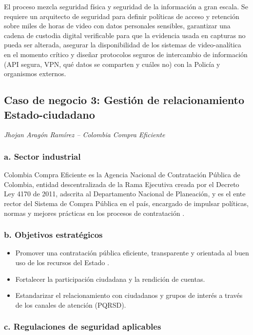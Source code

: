 El proceso mezcla seguridad física y seguridad de la información a gran escala. Se requiere un arquitecto de seguridad para definir políticas de acceso y retención sobre miles de horas de video con datos personales sensibles, garantizar una cadena de custodia digital verificable para que la evidencia usada en capturas no pueda ser alterada, asegurar la disponibilidad de los sistemas de video-analítica en el momento crítico y diseñar protocolos seguros de intercambio de información (API segura, VPN, qué datos se comparten y cuáles no) con la Policía y organismos externos.

\subsection{Caso de negocio 3: Gestión de relacionamiento Estado-ciudadano}

\textit{Jhojan Aragón Ramírez -- Colombia Compra Eficiente}

\subsubsection*{a. Sector industrial}

Colombia Compra Eficiente es la Agencia Nacional de Contratación Pública de Colombia, entidad descentralizada de la Rama Ejecutiva creada por el Decreto Ley 4170 de 2011, adscrita al Departamento Nacional de Planeación, y es el ente rector del Sistema de Compra Pública en el país, encargado de impulsar políticas, normas y mejores prácticas en los procesos de contratación \parencite{decretoley4170de2011,colombiacompra2021}.

\subsubsection*{b. Objetivos estratégicos}

\begin{itemize}
	\item Promover una contratación pública eficiente, transparente y orientada al buen uso de los recursos del Estado \parencite{colombiacompra2021}.
	\item Fortalecer la participación ciudadana y la rendición de cuentas.
	\item Estandarizar el relacionamiento con ciudadanos y grupos de interés a través de los canales de atención (PQRSD).
\end{itemize}

\subsubsection*{c. Regulaciones de seguridad aplicables}

